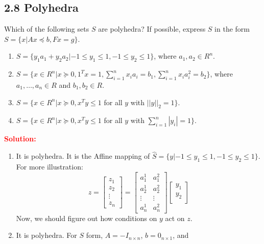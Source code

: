 \documentclass[a4paper]{article}
\begin{document}
\begin{latin}
\section{2.8 Polyhedra}
Which of the following sets $ S $ are polyhedra? If possible, express $ S $ in the form $ S = \{x | Ax \preceq b, F x = g\} $.
\begin{enumerate}
	\item $ S = \{y_{1}a_{1} + y_{2}a_{2} | −1 \leq y_{1} \leq 1, −1 \leq y_{2} \leq 1\} $, where $ a_{1}, a_{2} \in R^{n} $.
	\item $ S = \{x \in R^{n} | x \succeq 0, 1^{T} x = 1, \sum_{i=1}^{n} x_{i} a_{i} = b_{1}, \sum_{i=1}^{n} x_{i} a_{i}^{2} = b_{2}\} $, where
	$ a_{1}, \dots , a_{n} \in R$ and $b_{1}, b_{2} \in R $.
	\item $ S = \{x \in R^{n} | x \succeq 0, x^{T} y \leq 1$ for all $ y $ with $ ||y||_{2} = 1\} $.
	\item $ S = \{x \in R^{n} | x \succeq 0, x^{T} y \leq 1$ for all $ y $ with $ \sum_{i=1}^{n} |y_{i}| = 1\}$.
\end{enumerate}
\textcolor{red}{\textbf{Solution:}}
\begin{enumerate}
	\item It is polyhedra. It is the Affine mapping of $ \hat{S} = \{y | −1 \leq y_{1} \leq 1, −1 \leq y_{2} \leq 1\} $. For more illustration: 
	\begin{equation*}
		z = \begin{bmatrix} 
			z_{1} \\
			z_{2} \\
			\vdots \\
			z_{n}
		\end{bmatrix} = 
		\begin{bmatrix} 
			a_{1}^{1} & a_{1}^{2} \\
			a_{2}^{1} & a_{2}^{2} \\
			\vdots & \vdots\\
			a_{n}^{1} & a_{n}^{2} 
		\end{bmatrix}
		\begin{bmatrix} 
			y_{1} \\
			y_{2} \\
		\end{bmatrix}
	\end{equation*}
	Now, we should figure out how conditions on $ y $ act on $ z $.
	\item It is polyhedra. For $ S $ form, $ A = -I_{n \times n} $, $ b = 0_{n \times 1} $, and 

\end{enumerate}
\end{latin}
\end{document}
